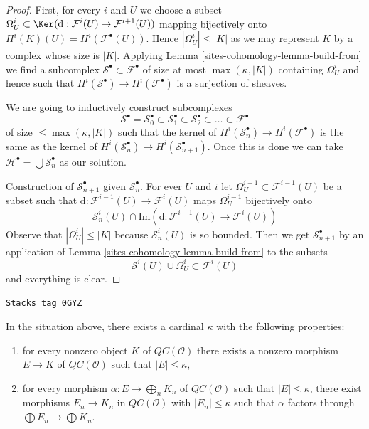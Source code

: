 \begin{proof}
First, for every $i$ and $U$ we choose a subset
$\Omega^i_U \subset \Ker(\text{d} :
\mathcal{F}^i(U) \to \mathcal{F}^{i + 1}(U))$
mapping bijectively onto
$H^i(K)(U) = H^i(\mathcal{F}^\bullet(U))$.
Hence $|\Omega^i_U| \leq |K|$ as we may represent $K$ by
a complex whose size is $|K|$.
Applying Lemma \ref{sites-cohomology-lemma-build-from}
we find a subcomplex $\mathcal{S}^\bullet \subset \mathcal{F}^\bullet$
of size at most $\max(\kappa, |K|)$ containing $\Omega^i_U$
and hence such that $H^i(\mathcal{S}^\bullet) \to H^i(\mathcal{F}^\bullet)$
is a surjection of sheaves.

\medskip\noindent
We are going to inductively construct subcomplexes
$$
\mathcal{S}^\bullet =
\mathcal{S}_0^\bullet \subset
\mathcal{S}_1^\bullet \subset
\mathcal{S}_2^\bullet \subset \ldots \subset \mathcal{F}^\bullet
$$
of size $\leq \max(\kappa, |K|)$ such that
the kernel of $H^i(\mathcal{S}_n^\bullet) \to H^i(\mathcal{F}^\bullet)$
is the same as the kernel of
$H^i(\mathcal{S}_n^\bullet) \to H^i(\mathcal{S}_{n + 1}^\bullet)$.
Once this is done we can take
$\mathcal{H}^\bullet = \bigcup \mathcal{S}_n^\bullet$ as our solution.

\medskip\noindent
Construction of $\mathcal{S}_{n + 1}^\bullet$ given
$\mathcal{S}_n^\bullet$. For ever $U$ and $i$ let
$\Omega^{i - 1}_U \subset \mathcal{F}^{i - 1}(U)$ be a subset
such that $\text{d} : \mathcal{F}^{i - 1}(U) \to \mathcal{F}^i(U)$
maps $\Omega^{i - 1}_U$ bijectively onto
$$
\mathcal{S}_n^i(U) \cap
\text{Im}(\text{d} : \mathcal{F}^{i - 1}(U)\to \mathcal{F}^i(U))
$$
Observe that $|\Omega^i_U| \leq |K|$ because $\mathcal{S}_n^i(U)$
is so bounded. Then we get $\mathcal{S}_{n + 1}^\bullet$ by an
application of Lemma \ref{sites-cohomology-lemma-build-from} to the subsets
$$
\mathcal{S}^i(U) \cup \Omega^i_U \subset \mathcal{F}^i(U)
$$
and everything is clear.
\end{proof}

\begin{lemma}
\label{sites-cohomology-lemma-cartesian-colimit-kappa}
\href{https://stacks.math.columbia.edu/tag/0GYZ}{\texttt{Stacks tag 0GYZ}}

In the situation above, there exists a cardinal $\kappa$ with the following
properties:
\begin{enumerate}
\item for every nonzero object $K$ of $\mathit{QC}(\mathcal{O})$ there exists a
nonzero morphism $E \to K$ of $\mathit{QC}(\mathcal{O})$ such that
$|E| \leq \kappa$,
\item for every morphism $\alpha : E \to \bigoplus_n K_n$ of
$\mathit{QC}(\mathcal{O})$ such that $|E| \leq \kappa$, there
exist morphisms $E_n \to K_n$
in $\mathit{QC}(\mathcal{O})$ with $|E_n| \leq \kappa$
such that $\alpha$ factors through $\bigoplus E_n \to \bigoplus K_n$.
\end{enumerate}
\end{lemma}

